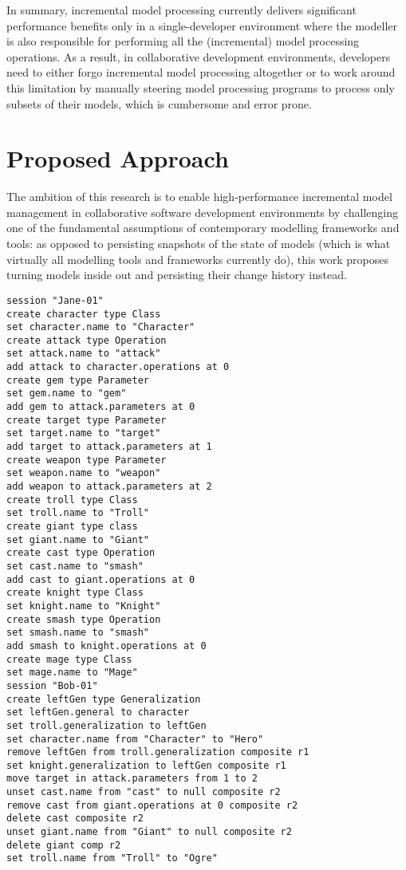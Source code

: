 In summary, incremental model processing currently delivers significant performance benefits only in a single-developer environment where the modeller is also responsible for performing all the (incremental) model processing operations. As a result, in collaborative development environments, developers need to either forgo incremental model processing altogether or to work around this limitation by manually steering model processing programs to process only subsets of their models, which is cumbersome and error prone.

\section{Proposed Approach}
\label{sec:proposed_approach}
The ambition of this research is to enable high-performance incremental model management in collaborative software development environments by challenging one of the fundamental assumptions of contemporary modelling frameworks and tools: as opposed to persisting snapshots of the state of models (which is what virtually all modelling tools and frameworks currently do), this work proposes turning models inside out and persisting their change history instead.

\begin{lstlisting}[style=xml,caption={Change-based representation of the model of Figure \ref{fig:modified_chart}.},label=lst:cbpmodel]
session "Jane-01"
create character type Class
set character.name to "Character" 
create attack type Operation
set attack.name to "attack" 
add attack to character.operations at 0
create gem type Parameter
set gem.name to "gem" 
add gem to attack.parameters at 0
create target type Parameter
set target.name to "target" 
add target to attack.parameters at 1
create weapon type Parameter
set weapon.name to "weapon" 
add weapon to attack.parameters at 2
create troll type Class
set troll.name to "Troll" 
create giant type class
set giant.name to "Giant"
create cast type Operation
set cast.name to "smash"
add cast to giant.operations at 0
create knight type Class
set knight.name to "Knight"
create smash type Operation
set smash.name to "smash"
add smash to knight.operations at 0
create mage type Class
set mage.name to "Mage" 
session "Bob-01"
create leftGen type Generalization
set leftGen.general to character
set troll.generalization to leftGen
set character.name from "Character" to "Hero"
remove leftGen from troll.generalization composite r1
set knight.generalization to leftGen composite r1
move target in attack.parameters from 1 to 2
unset cast.name from "cast" to null composite r2
remove cast from giant.operations at 0 composite r2
delete cast composite r2
unset giant.name from "Giant" to null composite r2
delete giant comp r2
set troll.name from "Troll" to "Ogre"
\end{lstlisting}

